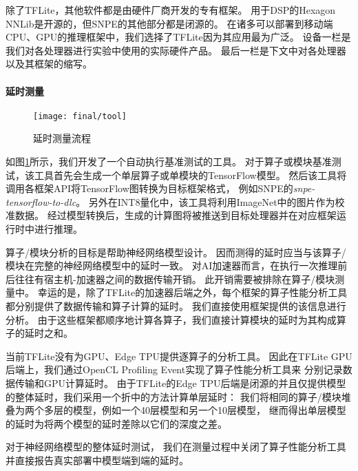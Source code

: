 除了TFLite，其他软件都是由硬件厂商开发的专有框架。
用于DSP的Hexagon NNLib是开源的，但SNPE的其他部分都是闭源的。
在诸多可以部署到移动端CPU、GPU的推理框架中，我们选择了TFLite因为其应用最为广泛\cite{xu2019first}。
设备一栏是我们对各处理器进行实验中使用的实际硬件产品。
最后一栏是下文中对各处理器以及其框架的缩写。

\paragraph{延时测量}

\begin{figure}[htbp]
    \centering
    \texttt{[image: final/tool]}
    \caption{\label{fig:tool}延时测量流程}
\end{figure}

如图\ref{fig:tool}所示，我们开发了一个自动执行基准测试的工具。
对于算子或模块基准测试，该工具首先会生成一个单层算子或单模块的TensorFlow模型。
然后该工具将调用各框架API将TensorFlow图转换为目标框架格式，
例如SNPE的\emph{snpe-tensorflow-to-dlc}。
另外在INT8量化中，该工具将利用ImageNet中的图片作为校准数据。
经过模型转换后，生成的计算图将被推送到目标处理器并在对应框架运行时中进行推理。

算子/模块分析的目标是帮助神经网络模型设计。
因而测得的延时应当与该算子/模块在完整的神经网络模型中的延时一致。
对AI加速器而言，在执行一次推理前后往往有宿主机-加速器之间的数据传输开销。
此开销需要被排除在算子/模块测量中。
幸运的是，除了TFLite的加速器后端之外，每个框架的算子性能分析工具都分别提供了数据传输和算子计算的延时。
我们直接使用框架提供的该信息进行分析。
由于这些框架都顺序地计算各算子，我们直接计算模块的延时为其构成算子的延时之和。

当前TFLite没有为GPU、Edge TPU提供逐算子的分析工具。
因此在TFLite GPU后端上，我们通过OpenCL Profiling Event实现了算子性能分析工具来
分别记录数据传输和GPU计算延时。
由于TFLite的Edge TPU后端是闭源的并且仅提供模型的整体延时，我们采用一个折中的方法计算单层延时：
我们将相同的算子/模块堆叠为两个多层的模型，例如一个40层模型和另一个10层模型，
继而得出单层模型的延时为将两个模型的延时差除以它们的深度之差。

对于神经网络模型的整体延时测试，
我们在测量过程中关闭了算子性能分析工具并直接报告真实部署中模型端到端的延时。